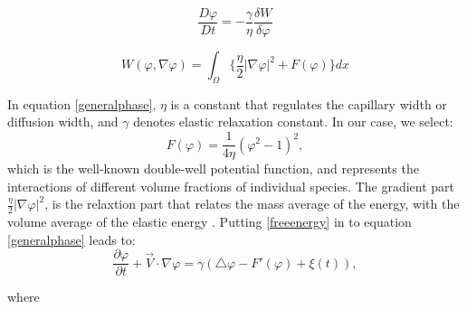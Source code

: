 \documentclass[letterpaper,10pt]{article}
\begin{document}
\begin{equation}
	\label{generalphase}
	\frac{D \varphi }{D t} = - \frac{\gamma}{\eta} \frac{\delta W} {\delta \varphi} 
\end{equation}

\begin{equation}
	\label{ginzlandu}
	W(\varphi,\nabla \varphi) = \int_\Omega \lbrace\frac{\eta}{2} |\nabla \varphi|^2 + F(\varphi) \rbrace dx
\end{equation}

In equation \eqref{generalphase}, $ \eta $ is a constant that regulates the capillary width or diffusion width, and $ \gamma $ denotes elastic relaxation constant. In our case, we select:
\begin{equation}
	\label{freeenergy}
	F(\varphi)=\frac{1}{4\eta} (\varphi^2-1)^2 ,
\end{equation}
which is the well-known double-well potential function, and represents the interactions of different volume fractions of individual species. The gradient part $ \frac{\eta}{2} |\nabla \varphi|^2$, 
is the relaxtion part that relates the mass average of the energy, with the volume average of the elastic energy \cite{Bronsard1990,Larson1999}.
Putting \eqref{freeenergy} in to equation \eqref{generalphase} leads to: 
\begin{equation} 
	\label{allencahn}
	\frac{\partial \varphi }{\partial t} + \overrightarrow{V}\cdot \nabla \varphi = 
	\gamma (\bigtriangleup\varphi -F'(\varphi)+\xi(t)),
\end{equation}

where
\end{document}
